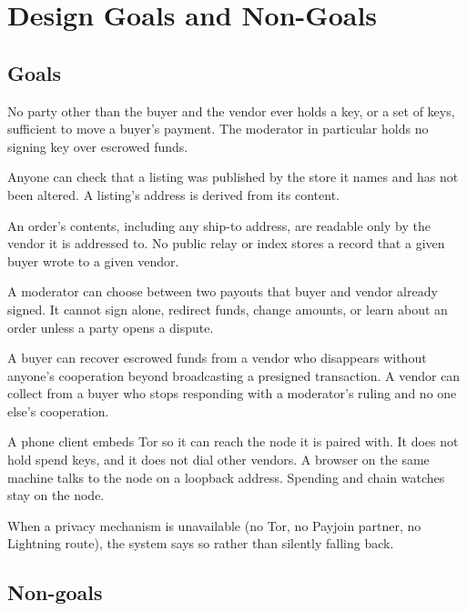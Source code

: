 \section{Design Goals and Non-Goals}
\label{sec:goals}

\subsection{Goals}

\begin{description}[leftmargin=1.2em]
  \item[G1. No custody.] No party other than the buyer and the vendor ever holds a key, or a set of keys, sufficient to move a buyer's payment. The moderator in particular holds no signing key over escrowed funds.
  \item[G2. Verifiable public catalog.] Anyone can check that a listing was published by the store it names and has not been altered. A listing's address is derived from its content.
  \item[G3. Private orders.] An order's contents, including any ship-to address, are readable only by the vendor it is addressed to. No public relay or index stores a record that a given buyer wrote to a given vendor.
  \item[G4. Bounded moderation.] A moderator can choose between two payouts that buyer and vendor already signed. It cannot sign alone, redirect funds, change amounts, or learn about an order unless a party opens a dispute.
  \item[G5. Liveness without a platform.] A buyer can recover escrowed funds from a vendor who disappears without anyone's cooperation beyond broadcasting a presigned transaction. A vendor can collect from a buyer who stops responding with a moderator's ruling and no one else's cooperation.
  \item[G6. Thin clients.] A phone client embeds Tor so it can reach the node it is paired with. It does not hold spend keys, and it does not dial other vendors. A browser on the same machine talks to the node on a loopback address. Spending and chain watches stay on the node.
  \item[G7. Honest degradation.] When a privacy mechanism is unavailable (no Tor, no Payjoin partner, no Lightning route), the system says so rather than silently falling back.
\end{description}

\subsection{Non-goals}

